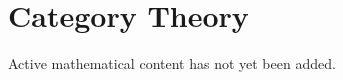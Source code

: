 
\section{Category Theory}

\begin{remark*}
Active mathematical content has not yet been added.
\end{remark*}
